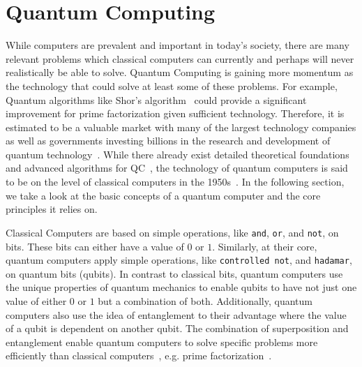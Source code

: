 \section{Quantum Computing}
While computers are prevalent and important in today's society, there are many relevant problems which classical computers can currently and perhaps will never realistically be able to solve. Quantum Computing is gaining more momentum as the technology that could solve at least some of these problems. For example, Quantum algorithms like Shor's algorithm~\cite{Shor97} could provide a significant improvement for prime factorization given sufficient technology. Therefore, it is estimated to be a valuable market with many of the largest technology companies as well as governments investing billions in the research and development of quantum technology~\cite{RDB*22}. While there already exist detailed theoretical foundations~\cite{van20, Ying11,YYF12} and advanced algorithms for QC~\cite{ACR*10,BGB*18,LoCh19,Shor97}, the technology of quantum computers is said to be on the level of classical computers in the 1950s~\cite{CFM17}. In the following section, we take a look at the basic concepts of a quantum computer and the core principles it relies on.

Classical Computers are based on simple operations, like \texttt{and}, \texttt{or}, and \texttt{not}, on bits. These bits can either have a value of $0$ or $1$. Similarly, at their core, quantum computers apply simple operations, like \texttt{controlled not}, and \texttt{hadamar}, on quantum bits (qubits). In contrast to classical bits, quantum computers use the unique properties of quantum mechanics to enable qubits to have not just one value of either $0$ or $1$ but a combination of both. Additionally, quantum computers also use the idea of entanglement to their advantage where the value of a qubit is dependent on another qubit. The combination of superposition and entanglement enable quantum computers to solve specific problems more efficiently than classical computers~\cite{RDB*22}, e.g. prime factorization~\cite{Shor97}.

